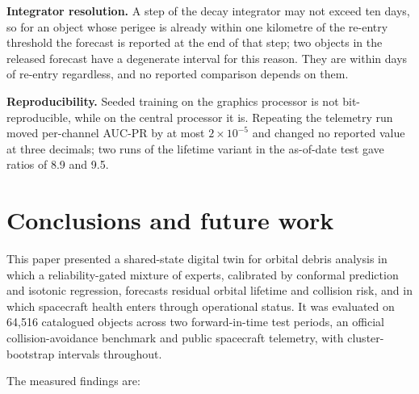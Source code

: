 \documentclass[3p,times,twocolumn]{elsarticle}
\begin{document}
\textbf{Integrator resolution.} A step of the decay integrator may not
exceed ten days, so for an object whose perigee is already within one
kilometre of the re-entry threshold the forecast is reported at the end
of that step; two objects in the released forecast have a degenerate
interval for this reason. They are within days of re-entry regardless,
and no reported comparison depends on them.

\textbf{Reproducibility.} Seeded training on the graphics processor is
not bit-reproducible, while on the central processor it is. Repeating
the telemetry run moved per-channel AUC-PR by at most
\(2 \times 10^{-5}\) and changed no reported value at three decimals;
two runs of the lifetime variant in the as-of-date test gave ratios of
8.9 and 9.5.

\section{Conclusions and future work}\label{sec:conclusion}

This paper presented a shared-state digital twin for orbital debris
analysis in which a reliability-gated mixture of experts, calibrated by
conformal prediction and isotonic regression, forecasts residual orbital
lifetime and collision risk, and in which spacecraft health enters
through operational status. It was evaluated on 64,516 catalogued
objects across two forward-in-time test periods, an official
collision-avoidance benchmark and public spacecraft telemetry, with
cluster-bootstrap intervals throughout.

The measured findings are:
\end{document}
